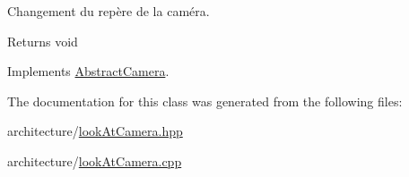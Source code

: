 Changement du repère de la caméra. 

\begin{DoxyReturn}{Returns}
void 
\end{DoxyReturn}


Implements \hyperlink{class_abstract_camera_a4bfcc6ed8980d64cf1d43d7dcb60129b}{Abstract\+Camera}.



The documentation for this class was generated from the following files\+:\begin{DoxyCompactItemize}
\item 
architecture/\hyperlink{look_at_camera_8hpp}{look\+At\+Camera.\+hpp}\item 
architecture/\hyperlink{look_at_camera_8cpp}{look\+At\+Camera.\+cpp}\end{DoxyCompactItemize}

